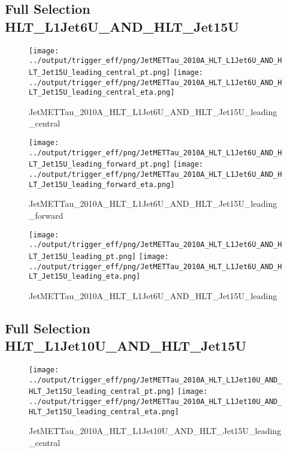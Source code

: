 \documentclass[11pt]{article}
\begin{document}
\newpage
\subsection{Full Selection HLT\_L1Jet6U\_AND\_HLT\_Jet15U}
\begin{figure}[ht]
\centering
\texttt{[image: ../output/trigger\_eff/png/JetMETTau\_2010A\_HLT\_L1Jet6U\_AND\_HLT\_Jet15U\_leading\_central\_pt.png]}
\texttt{[image: ../output/trigger\_eff/png/JetMETTau\_2010A\_HLT\_L1Jet6U\_AND\_HLT\_Jet15U\_leading\_central\_eta.png]}
\caption{JetMETTau\_2010A\_HLT\_L1Jet6U\_AND\_HLT\_Jet15U\_leading\_central}
\label{fig:jetmettau_L1Jet6U_AND_HLT_Jet15U_leading_central}
\end{figure}

\begin{figure}[ht]
\centering
\texttt{[image: ../output/trigger\_eff/png/JetMETTau\_2010A\_HLT\_L1Jet6U\_AND\_HLT\_Jet15U\_leading\_forward\_pt.png]}
\texttt{[image: ../output/trigger\_eff/png/JetMETTau\_2010A\_HLT\_L1Jet6U\_AND\_HLT\_Jet15U\_leading\_forward\_eta.png]}
\caption{JetMETTau\_2010A\_HLT\_L1Jet6U\_AND\_HLT\_Jet15U\_leading\_forward}
\label{fig:jetmettau_L1Jet6U_AND_HLT_Jet15U_leading_forward}
\end{figure}

\begin{figure}[ht]
\centering
\texttt{[image: ../output/trigger\_eff/png/JetMETTau\_2010A\_HLT\_L1Jet6U\_AND\_HLT\_Jet15U\_leading\_pt.png]}
\texttt{[image: ../output/trigger\_eff/png/JetMETTau\_2010A\_HLT\_L1Jet6U\_AND\_HLT\_Jet15U\_leading\_eta.png]}
\caption{JetMETTau\_2010A\_HLT\_L1Jet6U\_AND\_HLT\_Jet15U\_leading}
\label{fig:jetmettau_L1Jet6U_AND_HLT_Jet15U_leading}
\end{figure}

\newpage
\subsection{Full Selection HLT\_L1Jet10U\_AND\_HLT\_Jet15U}
\begin{figure}[ht]
\centering
\texttt{[image: ../output/trigger\_eff/png/JetMETTau\_2010A\_HLT\_L1Jet10U\_AND\_HLT\_Jet15U\_leading\_central\_pt.png]}
\texttt{[image: ../output/trigger\_eff/png/JetMETTau\_2010A\_HLT\_L1Jet10U\_AND\_HLT\_Jet15U\_leading\_central\_eta.png]}
\caption{JetMETTau\_2010A\_HLT\_L1Jet10U\_AND\_HLT\_Jet15U\_leading\_central}
\label{fig:jetmettau_L1Jet10U_AND_HLT_Jet15U_leading_central}
\end{figure}
\end{document}
